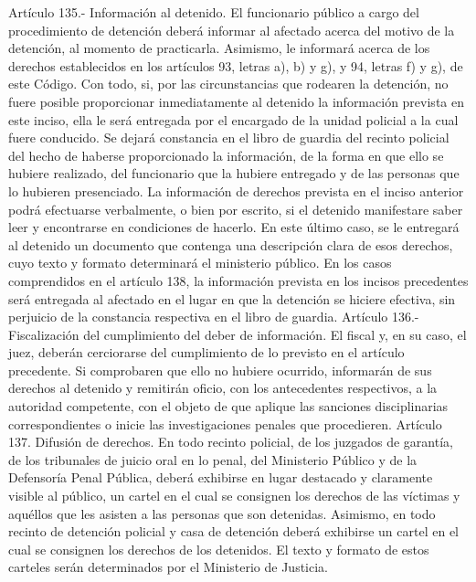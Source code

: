     Artículo 135.- Información al detenido. El funcionario público a cargo del procedimiento de detención deberá informar al afectado acerca del motivo de la detención, al momento de practicarla.
    Asimismo, le informará acerca de los derechos establecidos en los artículos 93, letras a), b) y g), y 94, letras f) y g), de este Código. Con todo, si, por las circunstancias que rodearen la detención, no fuere posible proporcionar inmediatamente al detenido la información prevista en este inciso, ella le será entregada por el encargado de la unidad policial a la cual fuere conducido. Se dejará constancia en el libro de guardia del recinto policial del hecho de haberse proporcionado la información, de la forma en que ello se hubiere realizado, del funcionario que la hubiere entregado y de las personas que lo hubieren presenciado.
    La información de derechos prevista en el inciso anterior podrá efectuarse verbalmente, o bien por escrito, si el detenido manifestare saber leer y encontrarse en condiciones de hacerlo. En este último caso, se le entregará al detenido un documento que contenga una descripción clara de esos derechos, cuyo texto y formato determinará el ministerio público.
    En los casos comprendidos en el artículo 138, la información prevista en los incisos precedentes será entregada al afectado en el lugar en que la detención se hiciere efectiva, sin perjuicio de la constancia respectiva en el libro de guardia.
    Artículo 136.- Fiscalización del cumplimiento del deber de información. El fiscal y, en su caso, el juez, deberán cerciorarse del cumplimiento de lo previsto en el artículo precedente. Si comprobaren que ello no hubiere ocurrido, informarán de sus derechos al detenido y remitirán oficio, con los antecedentes respectivos, a la autoridad competente, con el objeto de que aplique las sanciones disciplinarias correspondientes o inicie las investigaciones penales que procedieren.
    Artículo 137. Difusión de derechos. En todo recinto policial, de los juzgados de garantía, de los tribunales de juicio oral en lo penal, del Ministerio Público y de la Defensoría Penal Pública, deberá exhibirse en lugar destacado y claramente visible al público, un cartel en el cual se consignen los derechos de las víctimas y aquéllos que les asisten a las personas que son detenidas. Asimismo, en todo recinto de detención policial y casa de detención deberá exhibirse un cartel en el cual se consignen los derechos de los detenidos. El texto y formato de estos carteles serán determinados por el Ministerio de Justicia.

